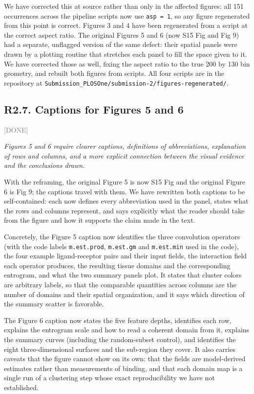 \documentclass[11pt]{article}
\newcommand{\status}[1]{\textcolor{gray}{\small\textsf{[#1]}}}
\newenvironment{rev}{\begin{leftbar}\itshape\small}{\end{leftbar}}
\begin{document}
We have corrected this at source rather than only in the affected figures: all 151 occurrences
across the pipeline scripts now use \texttt{asp = 1}, so any figure regenerated from this
point is correct. Figures 3 and 4 have been regenerated from a script at the correct aspect
ratio. The original Figures 5 and 6 (now S15 Fig and Fig 9) had a separate, unflagged version of
the same defect: their spatial
panels were drawn by a plotting routine that stretches each panel to fill the space given to
it. We have corrected those as well, fixing the aspect ratio to the true 200 by 130 bin
geometry, and rebuilt both figures from scripts. All four scripts are in the repository at
\texttt{Submission\_PLOSOne/submission-2/figures-regenerated/}.

\subsection{R2.7. Captions for Figures 5 and 6} \status{DONE}

\begin{rev}
Figures 5 and 6 require clearer captions, definitions of abbreviations, explanation of
rows and columns, and a more explicit connection between the visual evidence and the
conclusions drawn.
\end{rev}

\noindent With the reframing, the original Figure 5 is now S15 Fig and the original Figure 6 is
Fig 9; the captions travel with them. We have rewritten both captions to be self-contained: each now defines every
abbreviation used in the panel, states what the rows and columns represent, and says
explicitly what the reader should take from the figure and how it supports the claim made
in the text.

Concretely, the Figure 5 caption now identifies the three convolution operators (with the
code labels \texttt{m.est.prod}, \texttt{m.est.gm} and \texttt{m.est.min} used in the code),
the four example ligand-receptor pairs and their input fields, the interaction field each
operator produces, the resulting tissue domains and the corresponding entrogram, and what the
two summary panels plot. It states that cluster colors are arbitrary labels, so that the
comparable quantities across columns are the number of domains and their spatial
organization, and it says which direction of the summary scatter is favorable.

The Figure 6 caption now states the five feature depths, identifies each row, explains the
entrogram scale and how to read a coherent domain from it, explains the summary curves
(including the random-subset control), and identifies the eight three-dimensional surfaces
and the sub-region they cover. It also carries caveats that the figure cannot show on its
own: that the fields are model-derived estimates rather than measurements of binding, and
that each domain map is a single run of a clustering step whose exact reproducibility we
have not established.
\end{document}
